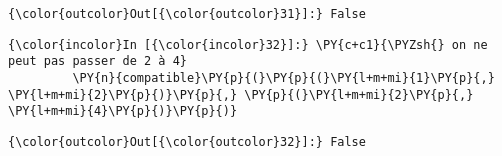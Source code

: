 \begin{Verbatim}[commandchars=\\\{\}]
{\color{outcolor}Out[{\color{outcolor}31}]:} False
\end{Verbatim}
            
    \begin{Verbatim}[commandchars=\\\{\}]
{\color{incolor}In [{\color{incolor}32}]:} \PY{c+c1}{\PYZsh{} on ne peut pas passer de 2 à 4}
         \PY{n}{compatible}\PY{p}{(}\PY{p}{(}\PY{l+m+mi}{1}\PY{p}{,} \PY{l+m+mi}{2}\PY{p}{)}\PY{p}{,} \PY{p}{(}\PY{l+m+mi}{2}\PY{p}{,} \PY{l+m+mi}{4}\PY{p}{)}\PY{p}{)}
\end{Verbatim}


\begin{Verbatim}[commandchars=\\\{\}]
{\color{outcolor}Out[{\color{outcolor}32}]:} False
\end{Verbatim}
            

    
    
    

